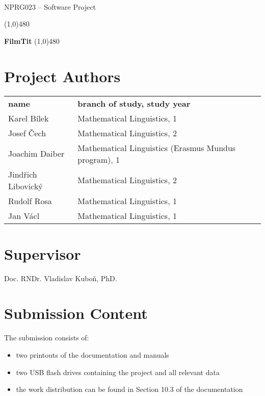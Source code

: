 \documentclass[11pt, oneside]{article}
\begin{document}
 \\
{\large NPRG023 -- Software Project}

\noindent\line(1,0){480}


\vspace*{0.4cm}

\hfill{\fontsize{30mm}{30mm}\bf\sf FilmTit}
\noindent\line(1,0){480}

\section*{Project Authors}

\setlength{\extrarowheight}{2mm}

\noindent\begin{tabular}{ll}

\bf name & \bf branch of study, study year \\
\Large Karel Bílek & Mathematical Linguistics, 1\\
\Large Josef Čech & Mathematical Linguistics, 2 \\
\Large Joachim Daiber & Mathematical Linguistics (Erasmus Mundus program), 1\\
\Large Jindřich Libovický & Mathematical Linguistics, 2\\
\Large Rudolf Rosa & Mathematical Linguistics, 1 \\
\Large Jan Václ & Mathematical Linguistics, 1 \\
\end{tabular}

\section*{Supervisor}
Doc. RNDr. Vladislav Kuboň, PhD.

\section*{Submission Content}

The submission consists of:

\begin{itemize}
\item two printouts of the documentation and manuals
\item two USB flash drives containing the project and all relevant data
\item the work distribution can be found in Section 10.3 of the documentation
\end{itemize}
\end{document}

